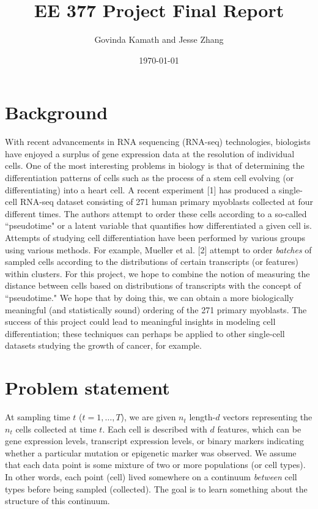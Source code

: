 \documentclass[11pt,onecolumn]{article}
\title{EE 377 Project Final Report}
\author{Govinda Kamath and Jesse Zhang}
\date{\today}
\begin{document}
\maketitle
 
\section{Background}
With recent advancements in RNA sequencing (RNA-seq) technologies, biologists have enjoyed a surplus of gene expression data at the resolution of individual cells. One of the most interesting problems in biology is that of determining the differentiation patterns of cells such as the process of a stem cell evolving (or differentiating) into a heart cell. A recent experiment [1] has produced a single-cell RNA-seq dataset consisting of 271 human primary myoblasts collected at four different times. The authors attempt to order these cells according to a so-called ``pseudotime" or a latent variable that quantifies how differentiated a given cell is. Attempts of studying cell differentiation have been performed by various groups using various methods. For example, Mueller et al. [2] attempt to order \textit{batches} of sampled cells according to the distributions of certain transcripts (or features) within clusters. For this project, we hope to combine the notion of measuring the distance between cells based on 
distributions of transcripts with the concept of ``pseudotime." We hope that by doing this, we can obtain a more biologically meaningful (and statistically sound) ordering of the 271 primary myoblasts. The success of this project could lead to meaningful insights in modeling cell differentiation; these techniques can perhaps be applied to other single-cell datasets studying the growth of cancer, for example.

\section{Problem statement}
At sampling time $t$ ($t = 1, \dots, T$), we are given $n_t$ length-$d$ vectors representing the $n_t$ cells collected at time $t$. Each cell is described with $d$ features, which can be gene expression levels, transcript expression levels, or binary markers indicating whether a particular mutation or epigenetic marker was observed. We assume that each data point is some mixture of two or more populations (or cell types). In other words, each point (cell) lived somewhere on a continuum \textit{between} cell types before being sampled (collected). The goal is to learn something about the structure of this continuum. \\
\end{document}
